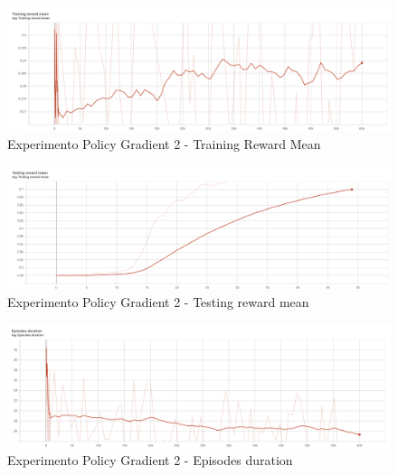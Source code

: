 \begin{figure}[H]
	\centering
	\includegraphics[width=1\textwidth]{figuras/experiments/policy_gradient/policy_gradient_normalized_image_reward_50_epochs/training_reward_mean.png}
	\caption[Experimento Policy Gradient 2 - Training Reward Mean]{Experimento Policy Gradient 2 - Training Reward Mean}
	\label{fig-experimento-policy-gradient-2-training-reward-mean}
\end{figure}
\begin{figure}[H]
	\centering
	\includegraphics[width=1\textwidth]{figuras/experiments/policy_gradient/policy_gradient_normalized_image_reward_50_epochs/testing_reward_mean.png}
	\caption[Experimento Policy Gradient 2 - Testing reward mean]{Experimento Policy Gradient 2 - Testing reward mean}
	\label{fig-experimento-policy-gradient-2-testing-reward-mean}
\end{figure}
\begin{figure}[H]
	\centering
	\includegraphics[width=1\textwidth]{figuras/experiments/policy_gradient/policy_gradient_normalized_image_reward_50_epochs/episodes_duration.png}
	\caption[Experimento Policy Gradient 2 - Episodes duration]{Experimento Policy Gradient 2 - Episodes duration}
	\label{fig-experimento-policy-gradient-2-episodes-duration}
\end{figure}


